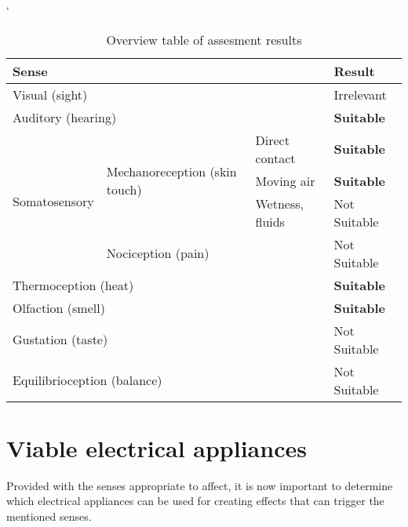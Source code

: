 \begin{table}[H]
\catcode`
\centering
\vspace{2em}
\begin{tabular}{|l|l|l|l|}
\hline
\multicolumn{3}{|l|}{\textbf{Sense}}                                                              & \textbf{Result}   \\ \hline
\multicolumn{3}{|l|}{Visual (sight)}                                                              & Irrelevant        \\ \hline
\multicolumn{3}{|l|}{Auditory (hearing)}                                                          & \textbf{Suitable} \\ \hline
\multirow{4}{*}{Somatosensory} & \multirow{3}{*}{Mechanoreception (skin touch)} & Direct contact  & \textbf{Suitable} \\ \cline{3-4} 
                                &                                                & Moving air      & \textbf{Suitable} \\ \cline{3-4} 
                                &                                                & Wetness, fluids & Not Suitable      \\ \cline{2-4} 
                                & \multicolumn{2}{l|}{Nociception (pain)}                          & Not Suitable      \\ \hline
\multicolumn{3}{|l|}{Thermoception (heat)}                                                        & \textbf{Suitable} \\ \hline
\multicolumn{3}{|l|}{Olfaction (smell)}                                                           & \textbf{Suitable} \\ \hline
\multicolumn{3}{|l|}{Gustation (taste)}                                                           & Not Suitable      \\ \hline
\multicolumn{3}{|l|}{Equilibrioception (balance)}                                                 & Not Suitable      \\ \hline
\end{tabular}
\caption{Overview table of assesment results}
\end{table}

\hypertarget{x-viable-electrical-appliances}{\section{Viable electrical appliances}}
Provided with the senses appropriate to affect, it is now important to determine
which electrical appliances can be used for creating effects that can trigger 
the mentioned senses.

